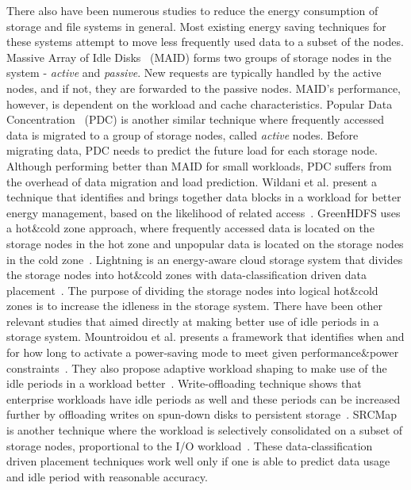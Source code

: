 There also have been numerous studies to reduce the energy consumption of storage
and file systems in general. Most existing energy saving techniques for these systems
attempt to move less frequently used data to a subset of the nodes. Massive Array of Idle
Disks~\cite{Colarelli:2002:MAI:762761.762819} (MAID) forms two groups of storage nodes in the
system - \textit{active} and \textit{passive}. New requests are typically handled by the active
nodes, and if not, they are forwarded to the passive nodes. MAID's performance, however, is
dependent on the workload and cache characteristics.
Popular Data Concentration~\cite{Pinheiro:2004:ECT:1006209.1006220} (PDC) is another similar
technique where frequently accessed data is migrated to a group of storage nodes, called
\textit{active} nodes. Before migrating data, PDC needs to predict the future load for each storage
node. Although performing better than MAID for small workloads, PDC suffers from the overhead of
data migration and load prediction.
Wildani et al. present a technique that identifies and brings together data blocks in a workload
for better energy management, based on the likelihood of related access~\cite{Wildani:2011:EIW:1987816.1987823}.
GreenHDFS uses a hot\&cold zone approach, where frequently accessed data is located on the storage
nodes in the hot zone and unpopular data is located on the storage nodes in the cold
zone~\cite{Kaushik:2010:GTE:1924920.1924927}.
Lightning is an energy-aware cloud storage system that divides the storage nodes into hot\&cold zones
with data-classification driven data placement~\cite{Kaushik:2010:LSE:1851476.1851523}. The purpose of dividing
the storage nodes into logical hot\&cold zones is to increase the idleness in the storage system.
There have been other relevant studies that aimed directly at making better use of idle periods in a storage system.
Mountroidou et al. presents a framework that identifies when and for how long to activate a power-saving
mode to meet given performance\&power constraints~\cite{10.1109/IGCC.2011.6008570}. They also propose adaptive
workload shaping to make use of the idle periods in a workload better~\cite{Mountrouidou:2011:AWS:1958746.1958766}.
Write-offloading technique shows that enterprise workloads have idle periods as well and these periods
can be increased further by offloading writes on spun-down disks to persistent storage~\cite{Narayanan:2008:WOP:1416944.1416949}.
SRCMap is another technique where the workload is selectively consolidated on a subset of storage
nodes, proportional to the I/O workload~\cite{Verma:2010:SEP:1855511.1855531}. These data-classification driven
placement techniques work well only if one is able to predict data usage and idle period with reasonable
accuracy.

